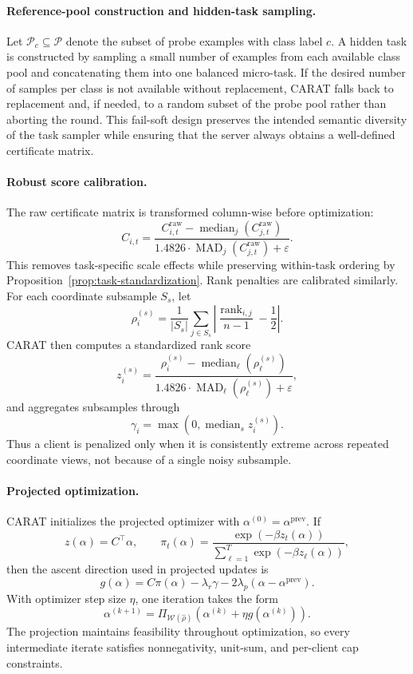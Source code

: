 \documentclass{article}
\begin{document}
\paragraph{Reference-pool construction and hidden-task sampling.}
Let $\mathcal{P}_c \subseteq \mathcal{P}$ denote the subset of probe examples with class label $c$. A hidden task is constructed by sampling a small number of examples from each available class pool and concatenating them into one balanced micro-task. If the desired number of samples per class is not available without replacement, CARAT falls back to replacement and, if needed, to a random subset of the probe pool rather than aborting the round. This fail-soft design preserves the intended semantic diversity of the task sampler while ensuring that the server always obtains a well-defined certificate matrix.

\paragraph{Robust score calibration.}
The raw certificate matrix is transformed column-wise before optimization:
\[
C_{i,t}
=
\frac{C^{\mathrm{raw}}_{i,t}-\operatorname{median}_j(C^{\mathrm{raw}}_{j,t})}
{1.4826 \cdot \operatorname{MAD}_j(C^{\mathrm{raw}}_{j,t})+\varepsilon}.
\]
This removes task-specific scale effects while preserving within-task ordering by Proposition~\ref{prop:task-standardization}. Rank penalties are calibrated similarly. For each coordinate subsample $S_s$, let
\[
\rho_i^{(s)}=
\frac{1}{|S_s|}\sum_{j \in S_s}
\left|
\frac{\operatorname{rank}_{i,j}}{n-1} - \frac{1}{2}
\right|.
\]
CARAT then computes a standardized rank score
\[
z_i^{(s)}=
\frac{\rho_i^{(s)}-\operatorname{median}_\ell(\rho_\ell^{(s)})}
{1.4826 \cdot \operatorname{MAD}_\ell(\rho_\ell^{(s)})+\varepsilon},
\]
and aggregates subsamples through
\[
\gamma_i=\max\left(0,\operatorname{median}_s z_i^{(s)}\right).
\]
Thus a client is penalized only when it is consistently extreme across repeated coordinate views, not because of a single noisy subsample.

\paragraph{Projected optimization.}
CARAT initializes the projected optimizer with $\alpha^{(0)}=\alpha^{\mathrm{prev}}$. If
\[
z(\alpha)=C^\top \alpha,
\qquad
\pi_t(\alpha)=\frac{\exp(-\beta z_t(\alpha))}{\sum_{\ell=1}^T \exp(-\beta z_\ell(\alpha))},
\]
then the ascent direction used in projected updates is
\[
g(\alpha)=C\pi(\alpha)-\lambda_r \gamma-2\lambda_p(\alpha-\alpha^{\mathrm{prev}}).
\]
With optimizer step size $\eta$, one iteration takes the form
\[
\alpha^{(k+1)}=
\Pi_{\mathcal{W}(\hat{\rho})}
\left(\alpha^{(k)}+\eta g(\alpha^{(k)})\right).
\]
The projection maintains feasibility throughout optimization, so every intermediate iterate satisfies nonnegativity, unit-sum, and per-client cap constraints.
\end{document}
